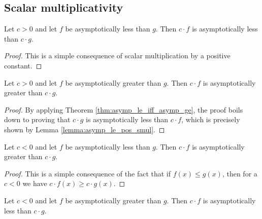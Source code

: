 \subsection{Scalar multiplicativity}

\begin{lemma}
    \label{lemma:asymp_le_pos_smul}
    \leanok
    Let $c > 0$ and let $f$ be asymptotically less than $g$. Then $c \cdot f$ is asymptotically
    less than $c \cdot g$.
\end{lemma}

\begin{proof}
    \leanok
    This is a simple consequence of scalar multiplication by a positive constant.
\end{proof}

\begin{lemma}
    \label{lemma:asymp_ge_pos_smul}
    \leanok
    Let $c > 0$ and let $f$ be asymptotically greater than $g$. Then $c \cdot f$ is asymptotically
    greater than $c \cdot g$.
\end{lemma}

\begin{proof}
    \leanok
    By applying Theorem \ref{thm:asymp_le_iff_asymp_ge}, the proof boils down to proving that
    $c \cdot g$ is asymptotically less than $c \cdot f$, which is precisely shown
    by Lemma \ref{lemma:asymp_le_pos_smul}.
\end{proof}

\begin{lemma}
    \label{lemma:asymp_le_neg_smul}
    \leanok
    Let $c < 0$ and let $f$ be asymptotically less than $g$. Then $c \cdot f$ is asymptotically
    greater than $c \cdot g$.
\end{lemma}

\begin{proof}
    \leanok
    This is a simple consequence of the fact that if $f(x) \le g(x)$, then for a $c < 0$
    we have $c \cdot f(x) \ge c \cdot g(x)$.
\end{proof}

\begin{lemma}
    \label{lemma:asymp_ge_neg_smul}
    \leanok
    Let $c < 0$ and let $f$ be asymptotically greater than $g$. Then $c \cdot f$ is asymptotically
    less than $c \cdot g$.
\end{lemma}

